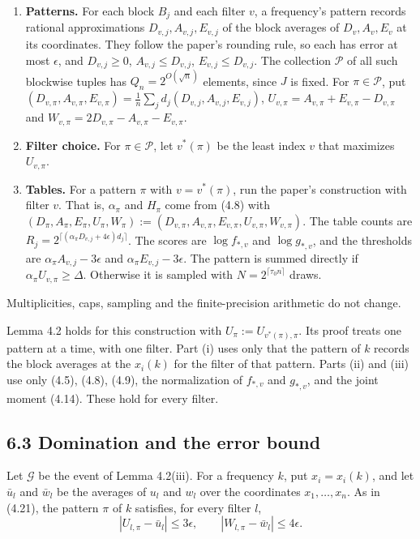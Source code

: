 \documentclass[10pt,a4paper]{article}
\begin{document}
\begin{enumerate}
\item \textbf{Patterns.} For each block $B_j$ and each filter $v$, a frequency's pattern records rational approximations
$D_{v,j}, A_{v,j}, E_{v,j}$ of the block averages of $D_v, A_v, E_v$ at its coordinates. They follow the paper's
rounding rule, so each has error at most $\epsilon$, and $D_{v,j} \ge 0$, $A_{v,j} \le D_{v,j}$, $E_{v,j} \le D_{v,j}$.
The collection $\mathcal P$ of all such blockwise tuples has $Q_n = 2^{O(\sqrt n)}$ elements, since $J$ is fixed. For
$\pi \in \mathcal P$, put $(D_{v,\pi}, A_{v,\pi}, E_{v,\pi}) = \frac1n\sum_jd_j(D_{v,j}, A_{v,j}, E_{v,j})$,
$U_{v,\pi} = A_{v,\pi} + E_{v,\pi} - D_{v,\pi}$ and $W_{v,\pi} = 2D_{v,\pi} - A_{v,\pi} - E_{v,\pi}$.
\item \textbf{Filter choice.} For $\pi\in\mathcal P$, let $v^*(\pi)$ be the least index $v$ that maximizes $U_{v,\pi}$.
\item \textbf{Tables.} For a pattern $\pi$ with $v = v^*(\pi)$, run the paper's construction with filter $v$. That is, $\alpha_\pi$
and $H_\pi$ come from (4.8) with $(D_\pi, A_\pi, E_\pi, U_\pi, W_\pi) := (D_{v,\pi}, A_{v,\pi}, E_{v,\pi}, U_{v,\pi}, W_{v,\pi})$.
The table counts are $R_j = 2^{\lceil(\alpha_\pi D_{v,j} + 4\epsilon)d_j\rceil}$. The scores are $\log f_{*,v}$ and
$\log g_{*,v}$, and the thresholds are $\alpha_\pi A_{v,j} - 3\epsilon$ and $\alpha_\pi E_{v,j} - 3\epsilon$. The pattern
is summed directly if $\alpha_\pi U_{v,\pi} \ge \Delta$. Otherwise it is sampled with $N = 2^{\lceil\tau_0 n\rceil}$
draws.
\end{enumerate}

Multiplicities, caps, sampling and the finite-precision arithmetic do not change.

Lemma 4.2 holds for this construction with $U_\pi := U_{v^*(\pi),\pi}$. Its proof treats one pattern at a time, with one
filter. Part (i) uses only that the pattern of $k$ records the block averages at the $x_i(k)$ for the filter of that
pattern. Parts (ii) and (iii) use only (4.5), (4.8), (4.9), the normalization of $f_{*,v}$ and $g_{*,v}$, and the joint
moment (4.14). These hold for every filter.

\subsection*{6.3 Domination and the error bound}

Let $\mathcal G$ be the event of Lemma 4.2(iii). For a frequency $k$, put $x_i = x_i(k)$, and let $\bar u_l$ and $\bar w_l$
be the averages of $u_l$ and $w_l$ over the coordinates $x_1, \dots, x_n$. As in (4.21), the pattern $\pi$ of $k$
satisfies, for every filter $l$,
\[|U_{l,\pi} - \bar u_l| \le 3\epsilon,\qquad |W_{l,\pi} - \bar w_l| \le 4\epsilon. \tag{6.1}\]
\end{document}
